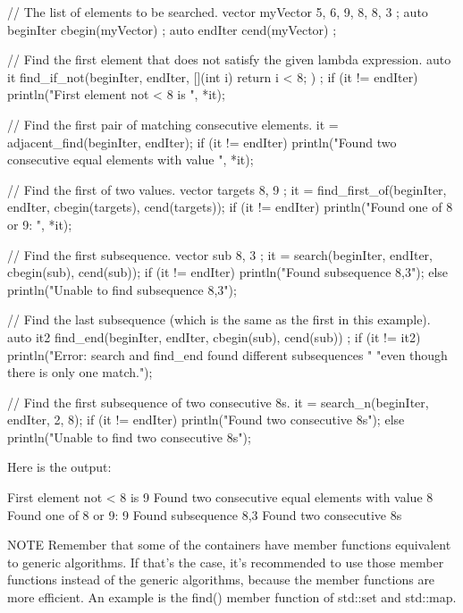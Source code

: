 \begin{cpp}
// The list of elements to be searched.
vector myVector { 5, 6, 9, 8, 8, 3 };
auto beginIter { cbegin(myVector) };
auto endIter { cend(myVector) };

// Find the first element that does not satisfy the given lambda expression.
auto it { find_if_not(beginIter, endIter, [](int i){ return i < 8; }) };
if (it != endIter) {
    println("First element not < 8 is {}", *it);
}

// Find the first pair of matching consecutive elements.
it = adjacent_find(beginIter, endIter);
if (it != endIter) {
    println("Found two consecutive equal elements with value {}", *it);
}

// Find the first of two values.
vector targets { 8, 9 };
it = find_first_of(beginIter, endIter, cbegin(targets), cend(targets));
if (it != endIter) {
    println("Found one of 8 or 9: {}", *it);
}

// Find the first subsequence.
vector sub { 8, 3 };
it = search(beginIter, endIter, cbegin(sub), cend(sub));
if (it != endIter) {
    println("Found subsequence {{8,3}}");
} else {
    println("Unable to find subsequence {{8,3}}");
}

// Find the last subsequence (which is the same as the first in this example).
auto it2 { find_end(beginIter, endIter, cbegin(sub), cend(sub)) };
if (it != it2) {
    println("Error: search and find_end found different subsequences "
        "even though there is only one match.");
}

// Find the first subsequence of two consecutive 8s.
it = search_n(beginIter, endIter, 2, 8);
if (it != endIter) {
    println("Found two consecutive 8s");
} else {
    println("Unable to find two consecutive 8s");
}
\end{cpp}

Here is the output:

\begin{shell}
First element not < 8 is 9
Found two consecutive equal elements with value 8
Found one of 8 or 9: 9
Found subsequence {8,3}
Found two consecutive 8s
\end{shell}

\begin{myNotic}{NOTE}
Remember that some of the containers have member functions equivalent to generic algorithms. If that’s the case, it’s recommended to use those member functions instead of the generic algorithms, because the member functions are more efficient. An example is the find() member function of std::set and std::map.
\end{myNotic}

